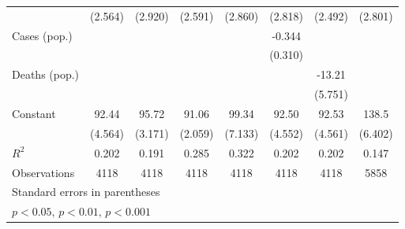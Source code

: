 \documentclass{article}
\begin{document}
{\begin{longtable}{l*{7}{c}}
                &  (2.564)         &  (2.920)         &  (2.591)         &  (2.860)         &  (2.818)         &  (2.492)         &  (2.801)         \\
Cases (pop.)    &                  &                  &                  &                  &   -0.344         &                  &                  \\
                &                  &                  &                  &                  &  (0.310)         &                  &                  \\
Deaths (pop.)   &                  &                  &                  &                  &                  &   -13.21\sym{*}  &                  \\
                &                  &                  &                  &                  &                  &  (5.751)         &                  \\
Constant        &    92.44\sym{***}&    95.72\sym{***}&    91.06\sym{***}&    99.34\sym{***}&    92.50\sym{***}&    92.53\sym{***}&    138.5\sym{***}\\
                &  (4.564)         &  (3.171)         &  (2.059)         &  (7.133)         &  (4.552)         &  (4.561)         &  (6.402)         \\
\hline
\(R^{2}\)       &    0.202         &    0.191         &    0.285         &    0.322         &    0.202         &    0.202         &    0.147         \\
Observations    &     4118         &     4118         &     4118         &     4118         &     4118         &     4118         &     5858         \\
\hline\hline
\multicolumn{8}{l}{\footnotesize Standard errors in parentheses}\\
\multicolumn{8}{l}{\footnotesize \sym{*} \(p<0.05\), \sym{**} \(p<0.01\), \sym{***} \(p<0.001\)}\\
\end{longtable}
}
\end{document}
